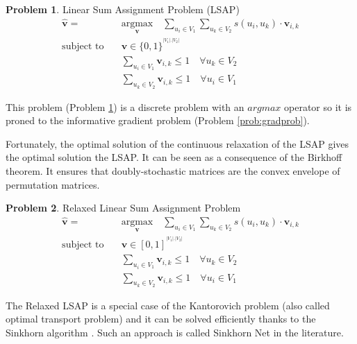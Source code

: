 \documentclass[times,onecolumn,final,authoryear]{article}
\theoremstyle{definition}
\newtheorem{problem}{Problem}
\begin{document}
\begin{problem}{Linear Sum Assignment Problem (LSAP)}
\label{prob:lsap}
\begin{subequations}
  \begin{align}
   \hat{\textbf{v}} =& \underset{\textbf{v}} {\mathrm{argmax}} \quad \sum_{u_i \in V_1}\sum_{u_k \in V_2} s(u_i, u_k)  \cdot \textbf{v}_{i,k} \\ 
    \text{subject to}\quad & \textbf{v} \in \{0, 1\}^{^{|V_1| . |V_2|}}\\
    &\sum_{u_i \in V_1} \textbf{v}_{i,k} \leq 1 \quad \forall u_k \in V_2\\
     &\sum_{u_k \in V_2} \textbf{v}_{i,k} \leq 1 \quad \forall u_i \in V_1
  \end{align}
\end{subequations}
\end{problem}

This problem (Problem \ref{prob:lsap}) is a discrete problem with an $\textit{argmax}$ operator so it is proned to the informative gradient problem (Problem \ref{prob:gradprob}). 

Fortunately, the optimal solution of the continuous relaxation of the LSAP gives the optimal solution the LSAP. It can be seen as a consequence of the Birkhoff theorem. It ensures that doubly-stochastic matrices are the convex envelope of permutation matrices.


\begin{problem}{Relaxed Linear Sum Assignment Problem}
\label{prob:relaxedlsap}
\begin{subequations}
  \begin{align}
   \hat{\textbf{v}} =& \underset{\textbf{v}} {\mathrm{argmax}} \quad \sum_{u_i \in V_1}\sum_{u_k \in V_2} s(u_i, u_k)  \cdot \textbf{v}_{i,k} \\ 
    \text{subject to}\quad & \textbf{v} \in [0, 1]^{^{|V_1| . |V_2|}}\\
    &\sum_{u_i \in V_1} \textbf{v}_{i,k} \leq 1 \quad \forall u_k \in V_2\\
     &\sum_{u_k \in V_2} \textbf{v}_{i,k} \leq 1 \quad \forall u_i \in V_1
  \end{align}
\end{subequations}
\end{problem}

The Relaxed LSAP is a special case of the Kantorovich problem (also called optimal transport problem) and it can be solved efficiently thanks to the Sinkhorn algorithm \cite{SinkhornAlgo}. Such an approach is called Sinkhorn Net \cite{PCA-GM} in the literature.
\end{document}
